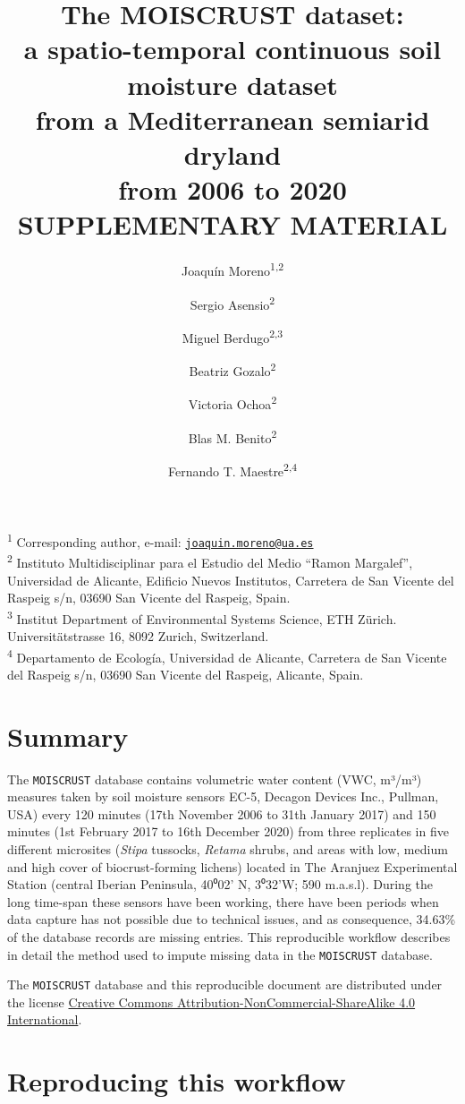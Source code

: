 \documentclass[]{article}
\title{The MOISCRUST dataset:\\
a spatio-temporal continuous soil moisture dataset\\
from a Mediterranean semiarid dryland\\
from 2006 to 2020\\
SUPPLEMENTARY MATERIAL}
\author{Joaquín Moreno\textsuperscript{1,2} \and Sergio Asensio\textsuperscript{2} \and Miguel Berdugo\textsuperscript{2,3} \and Beatriz Gozalo\textsuperscript{2} \and Victoria Ochoa\textsuperscript{2} \and Blas M. Benito\textsuperscript{2} \and Fernando T. Maestre\textsuperscript{2,4}}
\date{}
\begin{document}
\maketitle

{
\setcounter{tocdepth}{1}
\tableofcontents
}
\textsuperscript{1} Corresponding author, e-mail:
\href{mailto:joaquin.moreno@ua.es}{\nolinkurl{joaquin.moreno@ua.es}}\\
\textsuperscript{2} Instituto Multidisciplinar para el Estudio del Medio
``Ramon Margalef'', Universidad de Alicante, Edificio Nuevos Institutos,
Carretera de San Vicente del Raspeig s/n, 03690 San Vicente del Raspeig,
Spain.\\
\textsuperscript{3} Institut Department of Environmental Systems
Science, ETH Zürich. Universitätstrasse 16, 8092 Zurich, Switzerland.\\
\textsuperscript{4} Departamento de Ecología, Universidad de Alicante,
Carretera de San Vicente del Raspeig s/n, 03690 San Vicente del Raspeig,
Alicante, Spain.

\newpage

\hypertarget{summary}{%
\section{Summary}\label{summary}}

The \texttt{MOISCRUST} database contains volumetric water content (VWC,
m³/m³) measures taken by soil moisture sensors EC-5, Decagon Devices
Inc., Pullman, USA) every 120 minutes (17th November 2006 to 31th
January 2017) and 150 minutes (1st February 2017 to 16th December 2020)
from three replicates in five different microsites (\emph{Stipa}
tussocks, \emph{Retama} shrubs, and areas with low, medium and high
cover of biocrust-forming lichens) located in The Aranjuez Experimental
Station (central Iberian Peninsula, 40⁰02' N, 3⁰32'W; 590 m.a.s.l).
During the long time-span these sensors have been working, there have
been periods when data capture has not possible due to technical issues,
and as consequence, 34.63\% of the database records are missing entries.
This reproducible workflow describes in detail the method used to impute
missing data in the \texttt{MOISCRUST} database.

The \texttt{MOISCRUST} database and this reproducible document are
distributed under the license
\href{https://creativecommons.org/licenses/by/4.0/legalcode}{Creative
Commons Attribution-NonCommercial-ShareAlike 4.0 International}.

\hypertarget{reproducing-this-workflow}{%
\section{Reproducing this workflow}\label{reproducing-this-workflow}}
\end{document}
